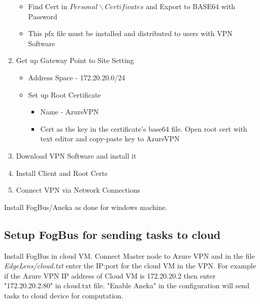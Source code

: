\documentclass{article}
\begin{document}
\begin{enumerate}
\begin{itemize}
\item Find Cert in $Personal\backslash Certificates$ and Export to BASE64 with Password
\item This pfx file must be installed and distributed to users with VPN Software
\end{itemize}
\item Get up Gateway Point to Site Setting
\begin{itemize}
\item Address Space - 172.20.20.0/24
\item Set up Root Certificate
\begin{itemize}
\item Name - AzureVPN
\item Cert as the key in the certificate's base64 file. Open root cert with text editor and copy-paste key to AzureVPN
\end{itemize}
\end{itemize}
\item Download VPN Software and install it
\item Install Client and Root Certs
\item Connect VPN via Network Connections
\end{enumerate}

Install FogBus/Aneka as done for windows machine.

\subsection{Setup FogBus for sending tasks to cloud}

Install FogBus in cloud VM. Connect Master node to Azure VPN and in the file \textit{EdgeLens/cloud.txt} enter the IP:port for the cloud VM in the VPN. For example if the Azure VPN IP address of Cloud VM is 172.20.20.2 then enter "172.20.20.2:80" in cloud.txt file. "Enable Aneka" in the configuration will send tasks to cloud device for computation.
\end{document}
